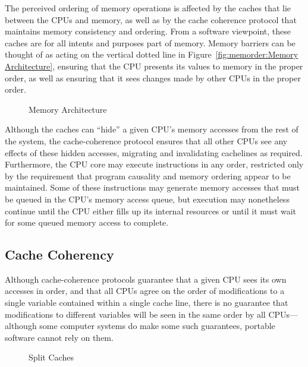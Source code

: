 The perceived ordering of memory operations is affected by the caches
that lie between the CPUs and memory, as well as by the cache coherence
protocol that maintains memory consistency and ordering.
From a software viewpoint, these caches are for all intents and purposes
part of memory.
Memory barriers can be thought of as acting on the vertical dotted line in
Figure~\ref{fig:memorder:Memory Architecture}, ensuring that the CPU
presents its values to memory in the proper order, as well as ensuring
that it sees changes made by other CPUs in the proper order.

\begin{figure}[htb]
\centering
\caption{Memory Architecture}
\end{figure}

Although the caches can ``hide'' a given CPU's memory accesses from the rest of
the system, the cache-coherence protocol ensures that all other CPUs see
any effects of these hidden accesses, migrating and invalidating cachelines
as required.
Furthermore, the CPU core may execute instructions in any order, restricted
only by the requirement that program causality and memory ordering
appear to be maintained.
Some of these instructions may generate memory accesses that must be queued
in the CPU's memory access queue, but execution may nonetheless continue
until the CPU either fills up its internal resources or until it must
wait for some queued memory access to complete.

\subsection{Cache Coherency}
\label{sec:memorder:Cache Coherency}

Although cache-coherence protocols guarantee that a given CPU sees its
own accesses in order, and that all CPUs agree on the order of modifications
to a single variable contained within a single cache line, there is no
guarantee that modifications to different variables will be seen in
the same order by all CPUs---although some computer systems do make
some such guarantees, portable software cannot rely on them.

\begin{figure}[htb]
\centering
\caption{Split Caches}
\end{figure}

